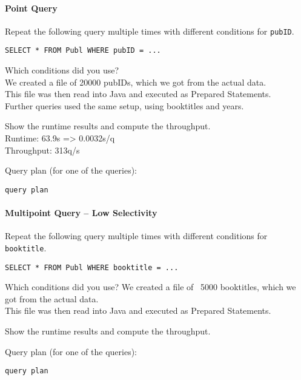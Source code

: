 \documentclass[11pt]{scrartcl}
\begin{document}
\paragraph{Point Query}

Repeat the following query multiple times with different conditions for {\tt pubID}.

{\small
\begin{verbatim}
SELECT * FROM Publ WHERE pubID = ...
\end{verbatim}
}

\noindent
Which conditions did you use?\\
We created a file of 20000 pubIDs, which we got from the actual data.\\
This file was then read into Java and executed as Prepared Statements.\\
Further queries used the same setup, using booktitles and years.

\smallskip\noindent
Show the runtime results and compute the throughput.\\
Runtime: 63.9s => 0.0032s/q\\
Throughput: 313q/s

\smallskip\noindent
Query plan (for one of the queries):
{\small
\begin{verbatim}
query plan
\end{verbatim}
}


\paragraph{Multipoint Query -- Low Selectivity}

Repeat the following query multiple times with different conditions for {\tt booktitle}.

{\small
\begin{verbatim}
SELECT * FROM Publ WHERE booktitle = ...
\end{verbatim}
}

\noindent
Which conditions did you use?
We created a file of ~5000 booktitles, which we got from the actual data.\\
This file was then read into Java and executed as Prepared Statements.

\smallskip\noindent
Show the runtime results and compute the throughput.

\smallskip\noindent
Query plan (for one of the queries):
{\small
\begin{verbatim}
query plan
\end{verbatim}
}
\end{document}
